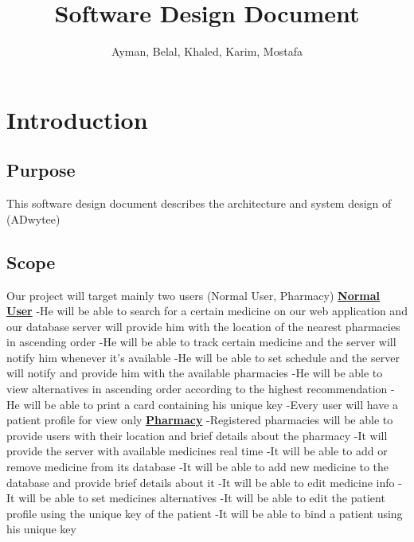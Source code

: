 \documentclass[]{article}
\title{Software Design Document}
\author{Ayman, Belal, Khaled, Karim, Mostafa}
\begin{document}
\maketitle

\section{Introduction}
\subsection{Purpose}
This software design document describes the architecture and system design of (ADwytee)


\subsection{Scope}
Our project will target mainly two users (Normal User, Pharmacy)
\newline
\newline
\textbf{\underline{Normal User}}
\newline
{}-He will be able to search for a certain medicine on our web application and our database server will provide him with the location of the nearest pharmacies in ascending order
-He will be able to track certain medicine and the server will notify him whenever it's available
-He will be able to set schedule and the server will notify and provide him with the available pharmacies
-He will be able to view alternatives in ascending order according to the highest recommendation
-He will be able to print a card containing his unique key
-Every user will have a patient profile for view only
\newline
\newline
\textbf{\underline{Pharmacy}}
\newline
{}-Registered pharmacies will be able to provide users with their location and brief details about the pharmacy
-It will provide the server with available medicines real time
-It will be able to add or remove medicine from its database
-It will be able to add new medicine to the database and provide brief details about it
-It will be able to edit medicine info
-It will be able to set medicines alternatives
-It will be able to edit the patient profile using the unique key of the patient
-It will be able to bind a patient using his unique key
\end{document}
